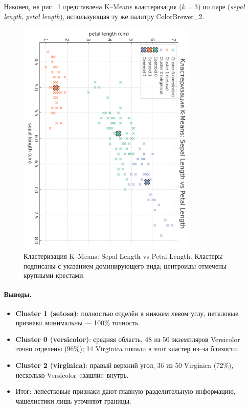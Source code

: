 Наконец, на рис.~\ref{fig:kmeans_cb2} представлена K–Means кластеризация ($k=3$) по паре (\emph{sepal length}, \emph{petal length}), использующая ту же палитру ColorBrewer\_2.

\begin{figure}[ht]
  \centering
  \includegraphics[width=0.8\textwidth]{images/cluster_plot_cb2.png}
  \caption{Кластеризация K–Means: Sepal Length vs Petal Length. Кластеры подписаны с указанием доминирующего вида; центроиды отмечены крупными крестами.}
  \label{fig:kmeans_cb2}
\end{figure}

\paragraph{Выводы.}
\begin{itemize}
  \item \textbf{Cluster 1 (setosa)}: полностью отделён в нижнем левом углу, петаловые признаки минимальны — 100\% точность.
  \item \textbf{Cluster 0 (versicolor)}: средняя область, 48 из 50 экземпляров Versicolor точно отделены (96\%); 14 Virginica попали в этот кластер из–за близости.
  \item \textbf{Cluster 2 (virginica)}: правый верхний угол, 36 из 50 Virginica (72\%), несколько Versicolor «зашли» внутрь.
  \item Итог: лепестковые признаки дают главную разделительную информацию, чашелистики лишь уточняют границы.
\end{itemize}

